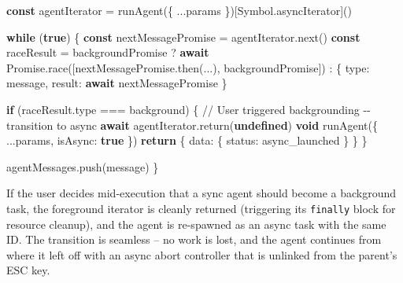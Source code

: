 \documentclass[
  english,
  11pt,
  letterpaper,
]{book}
\newenvironment{Shaded}{\begin{snugshade}}{\end{snugshade}}
\newcommand{\AttributeTok}[1]{\textcolor[rgb]{0.40,0.45,0.13}{#1}}
\newcommand{\BuiltInTok}[1]{\textcolor[rgb]{0.00,0.23,0.31}{#1}}
\newcommand{\CommentTok}[1]{\textcolor[rgb]{0.37,0.37,0.37}{#1}}
\newcommand{\ControlFlowTok}[1]{\textcolor[rgb]{0.00,0.23,0.31}{\textbf{#1}}}
\newcommand{\FunctionTok}[1]{\textcolor[rgb]{0.28,0.35,0.67}{#1}}
\newcommand{\KeywordTok}[1]{\textcolor[rgb]{0.00,0.23,0.31}{\textbf{#1}}}
\newcommand{\NormalTok}[1]{\textcolor[rgb]{0.00,0.23,0.31}{#1}}
\newcommand{\OperatorTok}[1]{\textcolor[rgb]{0.37,0.37,0.37}{#1}}
\newcommand{\StringTok}[1]{\textcolor[rgb]{0.13,0.47,0.30}{#1}}
\begin{document}
\begin{Shaded}
\begin{Highlighting}[]
\KeywordTok{const}\NormalTok{ agentIterator }\OperatorTok{=} \FunctionTok{runAgent}\NormalTok{(\{ }\OperatorTok{...}\NormalTok{params \})[}\BuiltInTok{Symbol}\OperatorTok{.}\AttributeTok{asyncIterator}\NormalTok{]()}

\ControlFlowTok{while}\NormalTok{ (}\KeywordTok{true}\NormalTok{) \{}
  \KeywordTok{const}\NormalTok{ nextMessagePromise }\OperatorTok{=}\NormalTok{ agentIterator}\OperatorTok{.}\FunctionTok{next}\NormalTok{()}
  \KeywordTok{const}\NormalTok{ raceResult }\OperatorTok{=}\NormalTok{ backgroundPromise}
    \OperatorTok{?} \ControlFlowTok{await} \BuiltInTok{Promise}\OperatorTok{.}\FunctionTok{race}\NormalTok{([nextMessagePromise}\OperatorTok{.}\FunctionTok{then}\NormalTok{(}\OperatorTok{...}\NormalTok{)}\OperatorTok{,}\NormalTok{ backgroundPromise])}
    \OperatorTok{:}\NormalTok{ \{ type}\OperatorTok{:} \StringTok{\textquotesingle{}message\textquotesingle{}}\OperatorTok{,}\NormalTok{ result}\OperatorTok{:} \ControlFlowTok{await}\NormalTok{ nextMessagePromise \}}

  \ControlFlowTok{if}\NormalTok{ (raceResult}\OperatorTok{.}\AttributeTok{type} \OperatorTok{===} \StringTok{\textquotesingle{}background\textquotesingle{}}\NormalTok{) \{}
    \CommentTok{// User triggered backgrounding {-}{-} transition to async}
    \ControlFlowTok{await}\NormalTok{ agentIterator}\OperatorTok{.}\FunctionTok{return}\NormalTok{(}\KeywordTok{undefined}\NormalTok{)}
    \KeywordTok{void} \FunctionTok{runAgent}\NormalTok{(\{ }\OperatorTok{...}\NormalTok{params}\OperatorTok{,}\NormalTok{ isAsync}\OperatorTok{:} \KeywordTok{true}\NormalTok{ \})}
    \ControlFlowTok{return}\NormalTok{ \{ data}\OperatorTok{:}\NormalTok{ \{ status}\OperatorTok{:} \StringTok{\textquotesingle{}async\_launched\textquotesingle{}}\NormalTok{ \} \}}
\NormalTok{  \}}

\NormalTok{  agentMessages}\OperatorTok{.}\FunctionTok{push}\NormalTok{(message)}
\NormalTok{\}}
\end{Highlighting}
\end{Shaded}

If the user decides mid-execution that a sync agent should become a
background task, the foreground iterator is cleanly returned (triggering
its \texttt{finally} block for resource cleanup), and the agent is
re-spawned as an async task with the same ID. The transition is seamless
-- no work is lost, and the agent continues from where it left off with
an async abort controller that is unlinked from the parent's ESC key.
\end{document}
